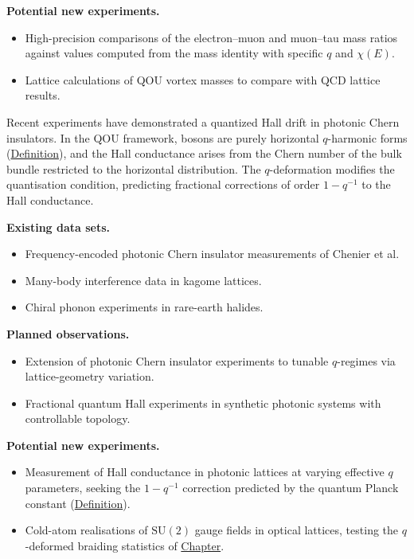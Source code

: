 \textbf{Potential new experiments.}

\begin{itemize}
  \item High-precision comparisons of the electron--muon and muon--tau mass ratios against values computed from the mass identity with specific $q$ and $\chi(E)$.
  \item Lattice calculations of QOU vortex masses to compare with QCD lattice results.
\end{itemize}

\begin{remark}
  \label{rem:photonic-hall}
Recent experiments have demonstrated a quantized Hall drift in photonic Chern
insulators. In the QOU framework, bosons are purely
horizontal $q$-harmonic forms (\hyperref[def:boson]{Definition}), and the Hall
conductance arises from the Chern number of the bulk bundle restricted to the
horizontal distribution. The $q$-deformation modifies the quantisation
condition, predicting fractional corrections of order $1 - q^{-1}$ to the Hall
conductance.
\end{remark}

\textbf{Existing data sets.}

\begin{itemize}
  \item Frequency-encoded photonic Chern insulator measurements of Chenier et al.
  \item Many-body interference data in kagome lattices.
  \item Chiral phonon experiments in rare-earth halides.
\end{itemize}

\textbf{Planned observations.}

\begin{itemize}
  \item Extension of photonic Chern insulator experiments to tunable $q$-regimes via lattice-geometry variation.
  \item Fractional quantum Hall experiments in synthetic photonic systems with controllable topology.
\end{itemize}

\textbf{Potential new experiments.}

\begin{itemize}
  \item Measurement of Hall conductance in photonic lattices at varying effective $q$ parameters, seeking the $1 - q^{-1}$ correction predicted by the quantum Planck constant (\hyperref[def:quantum-planck-constant]{Definition}).
  \item Cold-atom realisations of $\mathrm{SU}(2)$ gauge fields in optical lattices, testing the $q$-deformed braiding statistics of \hyperref[chap:path-integrals-braiding]{Chapter}.
\end{itemize}

